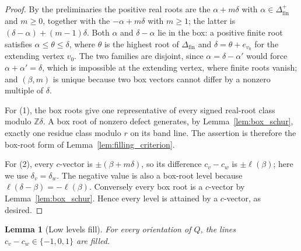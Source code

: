 \documentclass[11pt, a4paper]{amsart}
\newtheorem{lemma}[theorem]{Lemma}
\theoremstyle{definition}
\newcommand{\ZZ}{\mathbb{Z}}
\begin{document}
\begin{proof}
By the preliminaries the positive real roots are the $\alpha + m\delta$ with
$\alpha \in \Delta_{\mathrm{fin}}^{+}$ and $m \geq 0$, together with the
$-\alpha + m\delta$ with $m \geq 1$; the latter is $(\delta - \alpha) +
(m-1)\delta$. Both $\alpha$ and $\delta - \alpha$ lie in the box: a positive
finite root satisfies $\alpha \leq \theta \leq \delta$, where $\theta$ is
the highest root of $\Delta_{\mathrm{fin}}$ and $\delta = \theta + e_{v_0}$
for the extending vertex $v_0$. The two families are disjoint, since
$\alpha = \delta - \alpha'$ would force $\alpha + \alpha' = \delta$, which
is impossible at the extending vertex, where finite roots vanish; and
$(\beta, m)$ is unique because two box vectors cannot differ by a nonzero
multiple of $\delta$.

For (1), the box roots give one representative of every signed real-root
class modulo $\ZZ\delta$. A box root of nonzero defect generates, by
Lemma~\ref{lem:box_schur}, exactly one residue class modulo $r$ on its band
line. The assertion is therefore the box-root form of
Lemma~\ref{lem:filling_criterion}.

For (2), every $c$-vector is $\pm(\beta + m\delta)$, so its difference
$c_v - c_w$ is $\pm\ell(\beta)$; here we use $\delta_v = \delta_w$.
The negative value is also a box-root level because
$\ell(\delta-\beta)=-\ell(\beta)$. Conversely every box root is a $c$-vector by
Lemma~\ref{lem:box_schur}. Hence every level is attained by a $c$-vector,
as desired.
\end{proof}

\begin{lemma}[Low levels fill]
\label{lem:low_levels}
For every orientation of $Q$, the lines $c_v - c_w \in \{-1, 0, 1\}$ are
filled.
\end{lemma}
\end{document}
